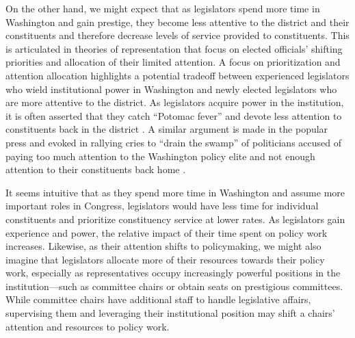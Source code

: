 \documentclass[12pt]{article}
\begin{document}
On the other hand, we might expect that as legislators spend more time in Washington and gain prestige, they become less attentive to the district and their constituents and therefore decrease levels of service provided to constituents. This is articulated in theories of representation that focus on elected officials' shifting priorities and allocation of their limited attention. A focus on prioritization and attention allocation highlights a potential tradeoff between experienced legislators who wield institutional power in Washington and newly elected legislators who are more attentive to the district. %
As legislators acquire power in the institution, it is often asserted that they catch ``Potomac fever'' and devote less attention to constituents back in the district \citep{Fenno1978}. A similar argument is made in the popular press \citep{Edwards2005} and evoked in rallying cries to ``drain the swamp'' of politicians accused of paying too much attention to the Washington policy elite and not enough attention to their constituents back home \citep{Rosenblatt2016}. 

It seems intuitive that as they spend more time in Washington and assume more important roles in Congress, legislators would have less time for individual constituents and prioritize constituency service at lower rates. 
As legislators gain experience and power, the relative impact of their time spent on policy work increases. 
Likewise, as their attention shifts to policymaking, we might also imagine that legislators allocate more of their resources towards their policy work, especially as representatives occupy increasingly powerful positions in the institution---such as committee chairs or obtain seats on prestigious committees. While committee chairs have additional staff to handle legislative affairs, supervising them and leveraging their institutional position may shift a chairs' attention and resources to policy work. 



\end{document}
